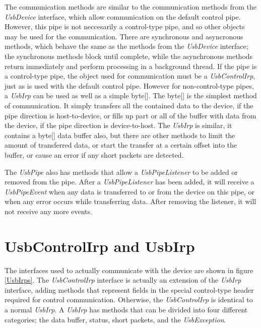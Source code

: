 \documentclass{article}
\newcommand{\myclass}[1]{\emph{#1}}
\newcommand{\myinterface}[1]{\emph{#1}}
\newcommand{\mysectionend}[0]{\vfill\pagebreak[1]}
\begin{document}
The communication methods are similar to the communication methods
from the \myinterface{UsbDevice} interface, which allow communication on the default
control pipe.  However, this pipe is not neccesarily a control-type pipe,
and so other objects may be used for the communication.  There are
synchronous and asyncronous methods, which behave the same as the
methods from the \myinterface{UsbDevice} interface; the synchronous methods block
until complete, while the asynchronous methods return immediately
and perform processing in a background thread.  If the pipe is a
control-type pipe, the object used for communication must be
a \myinterface{UsbControlIrp}, just as is used with the default control pipe.
However for non-control-type pipes, a \myinterface{UsbIrp} can be used as
well as a simple byte[].  The byte[] is the simplest method
of communication.  It simply transfers all the contained data
to the device, if the pipe direction is host-to-device, or fills up
part or all of the buffer with data from the device, if the pipe
direction is device-to-host.  The \myinterface{UsbIrp} is similar, it contains
a byte[] data buffer also, but there are other methods to limit
the amount of transferred data, or start the transfer at a certain offset
into the buffer, or cause an error if any short packets are detected.

The \myinterface{UsbPipe} also has methods that allow a \myinterface{UsbPipeListener} to be added or removed
from the pipe.  After a \myinterface{UsbPipeListener} has been added, it will receive a
\myclass{UsbPipeEvent} when any data is transferred to or from the device on this pipe,
or when any error occurs while transferring data.  After removing the listener,
it will not receive any more events.

\mysectionend

%

\section{UsbControlIrp and UsbIrp}

The interfaces used to actually communicate with the device are shown in
figure \ref{UsbIrps}.  The \myinterface{UsbControlIrp} interface is actually an extension
of the \myinterface{UsbIrp} interface, adding methods that represent fields in the special
control-type header required for control communication.  Otherwise, the
\myinterface{UsbControlIrp} is identical to a normal \myinterface{UsbIrp}.  A \myinterface{UsbIrp} has methods that
can be divided into four different categories; the data buffer, status,
short packets, and the \myclass{UsbException}.
\end{document}
